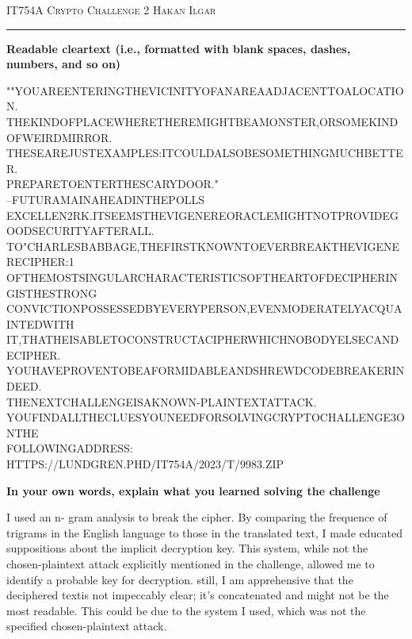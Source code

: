 \documentclass[12pt]{amsart}
\begin{document}
\thispagestyle{empty}

{\scshape IT754A} \hfill {\scshape \large Crypto Challenge 2} \hfill {\scshape Hakan Ilgar}
 
\smallskip

\hrule

\bigskip
\bigskip

{\bf Readable cleartext (i.e., formatted with blank spaces, dashes, numbers, and so on)}
\bigskip

\bigskip
{\small
""YOUAREENTERINGTHEVICINITYOFANAREAADJACENTTOALOCATION.\\THEKINDOFPLACEWHERETHEREMIGHTBEAMONSTER,ORSOMEKINDOFWEIRDMIRROR.\\THESEAREJUSTEXAMPLES:ITCOULDALSOBESOMETHINGMUCHBETTER.\\PREPARETOENTERTHESCARYDOOR."\\
--FUTURAMAINAHEADINTHEPOLLS\\
EXCELLEN2RK.ITSEEMSTHEVIGENEREORACLEMIGHTNOTPROVIDEGOODSECURITYAFTERALL.\\TO"CHARLESBABBAGE,THEFIRSTKNOWNTOEVERBREAKTHEVIGENERECIPHER:1\\OFTHEMOSTSINGULARCHARACTERISTICSOFTHEARTOFDECIPHERINGISTHESTRONG\\CONVICTIONPOSSESSEDBYEVERYPERSON,EVENMODERATELYACQUAINTEDWITH\\IT,THATHEISABLETOCONSTRUCTACIPHERWHICHNOBODYELSECANDECIPHER.\\
YOUHAVEPROVENTOBEAFORMIDABLEANDSHREWDCODEBREAKERINDEED.\\THENEXTCHALLENGEISAKNOWN-PLAINTEXTATTACK.\\YOUFINDALLTHECLUESYOUNEEDFORSOLVINGCRYPTOCHALLENGE3ONTHE\\FOLLOWINGADDRESS:\\
HTTPS://LUNDGREN.PHD/IT754A/2023/T/9983.ZIP
} \\

\bigskip


{\bf In your own words, explain what you learned solving the challenge}

\bigskip


I used an n- gram analysis to break the cipher. By comparing the frequence of trigrams in the English language to those in the translated text, I made educated suppositions about the implicit decryption key. This system, while not the chosen-plaintext attack explicitly mentioned in the challenge, allowed me to identify a probable key for decryption. still, I am apprehensive that the deciphered textis not impeccably clear; it's concatenated and might not be the most readable. This could be due to the system I used, which was not the specified chosen-plaintext attack.
\bigskip
\end{document}
